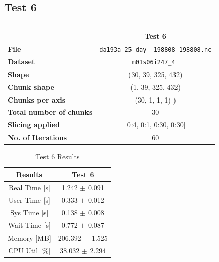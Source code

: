 \documentclass{article}
\begin{document}
\subsection{Test 6}

\begin{table}[h!] 
    \centering 
    \begin{tabular}{lc}  \hline
                                        & Test 6                                         \\ \hline
        \textbf{File}                   & \texttt{da193a\_25\_day\_\_198808-198808.nc}   \\  
        \textbf{Dataset}                &\texttt{m01s06i247\_4 }                         \\ 
        \textbf{Shape}                  & (30, 39, 325, 432)                             \\ 
        \textbf{Chunk shape}            & (1, 39, 325, 432)                              \\ 
        \textbf{Chunks per axis}        &  (30, 1, 1, 1) )                               \\ 
        \textbf{Total number of chunks} & 30                                             \\ 
        \textbf{Slicing applied}        & [0:4, 0:1, 0:30, 0:30]                         \\ 
        \textbf{No. of Iterations}      & 60                                             \\  \hline
    \end{tabular}
    \caption{} 
    \label{tab:T6_Conditions} 
\end{table}

\begin{table}[h!]
    \centering
    \begin{tabular}{cc}
        \hline
        \textbf{Results} & Test 6              \\ \hline
        Real Time [s]    & 1.242 $\pm$ 0.091  \\
        User Time [s]    & 0.333 $\pm$ 0.012  \\
        Sys Time [s]     & 0.138 $\pm$ 0.008  \\
        Wait Time [s]    & 0.772 $\pm$ 0.087  \\
        Memory [MB]      & 206.392 $\pm$ 1.525\\
        CPU Util [\%]    & 38.032 $\pm$ 2.294 \\
        \hline
    \end{tabular}
    \caption{Test 6 Results}
    \label{tab:T6_Results}
\end{table}
\end{document}
